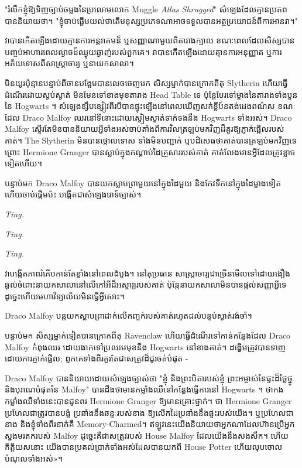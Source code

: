 "រំលឹកខ្ញុំឱ្យទិញច្បាប់ចម្លងនៃប្រលោមលោក Muggle \emph{Atlas Shrugged}" សំឡេងដែលគ្មានប្រភពបាននិយាយថា។ "ខ្ញុំចាប់ផ្តើមយល់ថាតើមនុស្សប្រភេទណាអាចទទួលបានអត្ថប្រយោជន៍ពីការអានវា។"


វាបានកើតឡើងដោយគ្មានការអន្តរាគមន៏ ឬសញ្ញាណាមួយពីតារាងក្បាល ខណៈពេលដែលសិស្សបានបញ្ចប់អាហារពេលល្ងាចដ៏ឈ្ងុយឆ្ងាញ់របស់ពួកគេ។ វាបានកើតឡើងដោយគ្មានការអនុញ្ញាត ឬការអភ័យទោសពីសាស្រ្តាចារ្យ ឬនាយកសាលា។

មិនយូរប៉ុន្មានបន្ទាប់ពីចានបង្អែមបានលេចចេញមក សិស្សម្នាក់បានក្រោកពីតុ Slytherin ហើយធ្វើដំណើរដោយស្ងប់ស្ងាត់ មិនមែនទៅខាងមុខតារាង Head Table ទេ ប៉ុន្តែបែរទៅម្ខាងនៃតារាងទាំងបួននៃ Hogwarts ។ សំឡេងខ្សឹបខ្សៀវពីរបីបានផ្ទុះឡើងនៅពេលឃើញសក់ខ្លីប៍នតង់ដេងពណ៌ស ខណៈដែល Draco Malfoy ឈរនៅទីនោះដោយស្ងៀមស្ងាត់ទាក់ទងនឹង Hogwarts ទាំងអស់។ Draco Malfoy ស្ទើរតែមិនបាននិយាយអ្វីទាំងអស់ចាប់តាំងពីការវិលត្រឡប់មកវិញដ៏គួរឱ្យភ្ញាក់ផ្អើលរបស់គាត់។ The Slytherin មិន​បាន​ថ្កោលទោស ទាំង​មិន​បញ្ជាក់ ឬ​បដិសេធ​ថា​គាត់​បាន​ត្រឡប់​មក​វិញ​ទេ ព្រោះ Hermione Granger បាន​ស្លាប់​ក្នុង​កណ្ដាប់​ដៃ​គ្រួសារ​របស់​គាត់ គាត់​លែង​មាន​អ្វី​ដែល​ត្រូវ​ខ្លាច​ទៀត​ហើយ។

បន្ទាប់មក Draco Malfoy បានយកស្លាបព្រាមួយនៅក្នុងដៃមួយ និងកែវទឹកនៅក្នុងដៃម្ខាងទៀត ហើយចាប់ផ្តើមប៉ះ បង្កើតជាសំឡេងរោទ៍ច្បាស់។

\emph{Ting.}

\emph{Ting.}

\emph{Ting.}

វាបង្កើតភាពរំភើបកាន់តែខ្លាំងនៅពេលដំបូង។ នៅតុប្រធាន សាស្ត្រាចារ្យជាច្រើនមើលទៅដោយងឿងឆ្ងល់ចំពោះនាយកសាលានៅលើកៅអីដ៏អស្ចារ្យរបស់គាត់ ប៉ុន្តែនាយកសាលាមិនបានផ្តល់សញ្ញាអ្វីទេ ដូច្នេះហើយមហាវិទ្យាល័យមិនធ្វើអ្វីសោះ។

Draco Malfoy បន្ត​យក​ស្លាបព្រា​ដាក់​លើ​កញ្ចក់​របស់​គាត់​រហូត​ដល់​បន្ទប់​ស្ងាត់​រង់ចាំ។

បន្ទាប់មក សិស្សម្នាក់ទៀតបានក្រោកពីតុ Ravenclaw ហើយធ្វើដំណើរទៅកាន់កន្លែងដែល Draco Malfoy កំពុងឈរ ដោយងាកទៅប្រឈមមុខនឹង Hogwarts នៅខាងគាត់។ ដង្ហើមត្រូវបានទាញដោយការភ្ញាក់ផ្អើល; ពួកគេទាំងពីរគួរតែជាសត្រូវដ៏ជូរចត់បំផុត -

Draco Malfoy បាននិយាយដោយសំឡេងច្បាស់ថា "ខ្ញុំ និងព្រះបិតារបស់ខ្ញុំ ព្រះអម្ចាស់នៃផ្ទះដ៏ថ្លៃថ្នូ និងបុរាណបំផុតនៃ Malfoy" បានដឹងថាមានកម្លាំងឈឺនៅកន្លែងធ្វើការនៅ Hogwarts ។ ថាកងកម្លាំងឈឺទាំងនេះបានជូនពរ Hermione Granger ឱ្យមានគ្រោះថ្នាក់។ ថា Hermione Granger ប្រហែលជាត្រូវបានបង្ខំ ប្រឆាំងនឹងឆន្ទៈរបស់នាង ឱ្យលើកដៃប្រឆាំងនឹងផ្ទះរបស់យើង។ ឬប្រហែលជានាង និងខ្ញុំទាំងពីរនាក់គឺ Memory-Charmed។ ឥឡូវនេះយើងនិយាយថាអ្នកណាដែលហ៊ានប្រើអ្នកស្នងមរតករបស់ Malfoy ដូច្នេះគឺជាសត្រូវរបស់ House Malfoy ដែលយើងនឹងសងសឹក។ ហើយ​កិត្តិយស​នោះ យើង​បាន​ប្រគល់​ប្រាក់​ទាំង​អស់​ដែល​បាន​យក​ពី House Potter ហើយ​លុប​ចោល​បំណុល​ទាំង​អស់​»។

